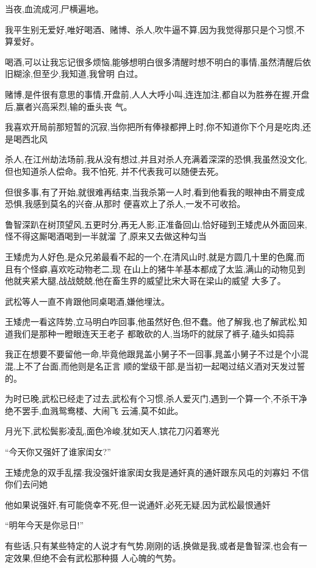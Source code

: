 ﻿\documentclass[12pt]{article}
\begin{document}
当夜,血流成河,尸横遍地。

我平生别无爱好,唯好喝酒、赌博、杀人,吹牛逼不算,因为我觉得那只是个习惯,不算爱好。

喝酒,可以让我忘记很多烦恼,能够想明白很多清醒时想不明白的事情,虽然清醒后依旧糊涂,但至少,我知道,我曾明
白过。

赌博,是件很有意思的事情,开盘前,人人大呼小叫,连连加注,都自以为胜券在握,开盘后,赢者兴高采烈,输的垂头丧
气。

我喜欢开局前那短暂的沉寂,当你把所有俸禄都押上时,你不知道你下个月是吃肉,还是喝西北风\dldots

杀人,在江州劫法场前,我从没有想过,并且对杀人充满着深深的恐惧,我虽然没文化,但也知道杀人偿命。我不怕死,
并不代表我可以随便去死。

但很多事,有了开始,就很难再结束,当我杀第一人时,看到他看我的眼神由不屑变成恐惧,我感到莫名的兴奋,从那时
便喜欢上了杀人,一发不可收拾。

鲁智深趴在树顶望风,五更时分,再无人影,正准备回山,恰好碰到王矮虎从外面回来,怪不得这厮喝酒喝到一半就溜
了,原来又去做这种勾当

王矮虎为人好色,是众兄弟最看不起的一个,在清风山时,就是方圆几十里的色魔,而且有个怪癖,喜欢吃动物老二,现
在山上的猪牛羊基本都成了太监,满山的动物见到他就夹紧大腿,战战兢兢,他在畜生界的威望比宋大哥在梁山的威望
大多了。

武松等人一直不肯跟他同桌喝酒,嫌他埋汰。

王矮虎一看这阵势,立马明白咋回事,他虽然好色,但不蠢。他了解我,也了解武松,知道我们是那种一瞪眼连天王老子
都敢砍的人,当场吓的就尿了裤子,磕头如捣蒜

我正在想要不要留他一命,毕竟他跟晁盖小舅子不一回事,晁盖小舅子不过是个小混混,上不了台面,而他则是名正言
顺的堂级干部,是当初一起喝过结义酒对天发过誓的。

为时已晚,武松已经走了过去,武松有个习惯,杀人爱灭门,遇到一个算一个,不杀干净绝不罢手,血溅鸳鸯楼、大闹飞
云浦,莫不如此。

月光下,武松鬓影凌乱,面色冷峻,犹如天人,镔花刀闪着寒光

``今天你又强奸了谁家闺女?''

王矮虎急的双手乱摆:我没强奸谁家闺女\dldots 我是通奸\dldots 真的\dldots 通奸\dldots 跟东风屯的刘寡妇\dldots
不信你们去问她\dldots

他如果说强奸,有可能侥幸不死,但一说通奸,必死无疑,因为武松最恨通奸

``明年今天是你忌日!''

有些话,只有某些特定的人说才有气势,刚刚的话,换做是我,或者是鲁智深,也会有一定效果,但绝不会有武松那种摄
人心魄的气势。
\end{document}
